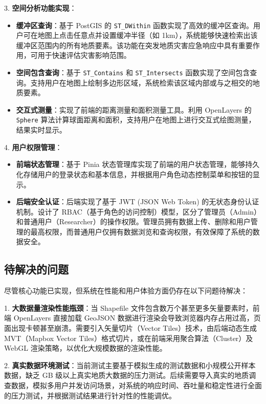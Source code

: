 \documentclass[a4paper,12pt]{ctexart}
\begin{document}
3. \textbf{空间分析功能实现}：
   \begin{itemize}
       \item \textbf{缓冲区查询}：基于 PostGIS 的 \texttt{ST\_DWithin} 函数实现了高效的缓冲区查询。用户可在地图上点击任意点并设置缓冲半径（如 1km），系统能够快速检索出该缓冲区范围内的所有地质要素。该功能在突发地质灾害应急响应中具有重要作用，可用于快速评估灾害影响范围。
       \item \textbf{空间包含查询}：基于 \texttt{ST\_Contains} 和 \texttt{ST\_Intersects} 函数实现了空间包含查询。支持用户在地图上绘制多边形区域，系统检索该区域内部或与之相交的地质要素。
       \item \textbf{交互式测量}：实现了前端的距离测量和面积测量工具。利用 OpenLayers 的 \texttt{Sphere} 算法计算球面距离和面积，支持用户在地图上进行交互式绘图测量，结果实时显示。
   \end{itemize}

4. \textbf{用户权限管理}：
   \begin{itemize}
       \item \textbf{前端状态管理}：基于 Pinia 状态管理库实现了前端的用户状态管理，能够持久化存储用户的登录状态和基本信息，并根据用户角色动态控制菜单和按钮的显示。
       \item \textbf{后端安全认证}：后端实现了基于 JWT (JSON Web Token) 的无状态身份认证机制。设计了 RBAC（基于角色的访问控制）模型，区分了管理员（Admin）和普通用户（Researcher）的操作权限。管理员拥有数据上传、删除和用户管理的最高权限，而普通用户仅拥有数据浏览和查询权限，有效保障了系统的数据安全。
   \end{itemize}

\subsection{待解决的问题}

尽管核心功能已实现，但系统在性能和用户体验方面仍存在以下问题待解决：

1. \textbf{大数据量渲染性能瓶颈}：当 Shapefile 文件包含数万个甚至更多矢量要素时，前端 OpenLayers 直接加载 GeoJSON 数据进行渲染会导致浏览器内存占用过高，页面出现卡顿甚至崩溃。需要引入矢量切片（Vector Tiles）技术，由后端动态生成 MVT（Mapbox Vector Tiles）格式切片，或在前端采用聚合算法（Cluster）及 WebGL 渲染策略，以优化大规模数据的渲染性能。

2. \textbf{真实数据环境测试}：当前测试主要基于模拟生成的测试数据和小规模公开样本数据，缺乏 GB 级以上真实地质大数据的压力测试。后续需要导入真实的地质调查数据，模拟多用户并发访问场景，对系统的响应时间、吞吐量和稳定性进行全面的压力测试，并根据测试结果进行针对性的性能调优。
\end{document}
